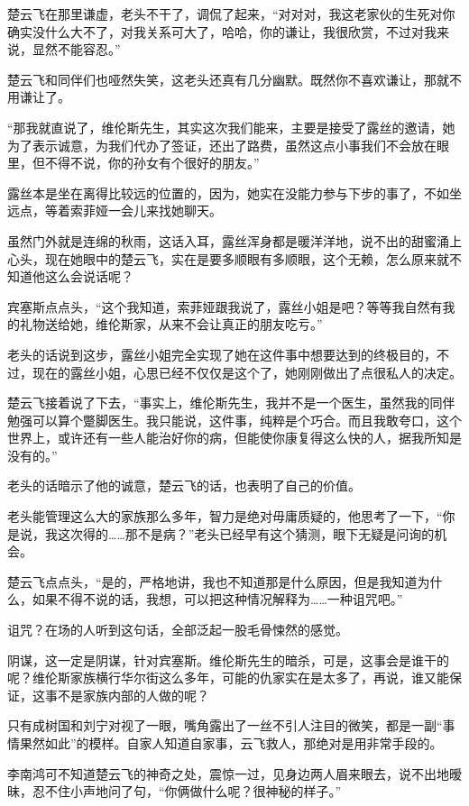 楚云飞在那里谦虚，老头不干了，调侃了起来，“对对对，我这老家伙的生死对你确实没什么大不了，对我关系可大了，哈哈，你的谦让，我很欣赏，不过对我来说，显然不能容忍。”

楚云飞和同伴们也哑然失笑，这老头还真有几分幽默。既然你不喜欢谦让，那就不用谦让了。

“那我就直说了，维伦斯先生，其实这次我们能来，主要是接受了露丝的邀请，她为了表示诚意，为我们代办了签证，还出了路费，虽然这点小事我们不会放在眼里，但不得不说，你的孙女有个很好的朋友。”

露丝本是坐在离得比较远的位置的，因为，她实在没能力参与下步的事了，不如坐远点，等着索菲娅一会儿来找她聊天。

虽然门外就是连绵的秋雨，这话入耳，露丝浑身都是暖洋洋地，说不出的甜蜜涌上心头，现在她眼中的楚云飞，实在是要多顺眼有多顺眼，这个无赖，怎么原来就不知道他这么会说话呢？

宾塞斯点点头，“这个我知道，索菲娅跟我说了，露丝小姐是吧？等等我自然有我的礼物送给她，维伦斯家，从来不会让真正的朋友吃亏。”

老头的话说到这步，露丝小姐完全实现了她在这件事中想要达到的终极目的，不过，现在的露丝小姐，心思已经不仅仅是这个了，她刚刚做出了点很私人的决定。

楚云飞接着说了下去，“事实上，维伦斯先生，我并不是一个医生，虽然我的同伴勉强可以算个蹩脚医生。我只能说，这件事，纯粹是个巧合。而且我敢夸口，这个世界上，或许还有一些人能治好你的病，但能使你康复得这么快的人，据我所知是没有的。”

老头的话暗示了他的诚意，楚云飞的话，也表明了自己的价值。

老头能管理这么大的家族那么多年，智力是绝对毋庸质疑的，他思考了一下，“你是说，我这次得的……那不是病？”老头已经早有这个猜测，眼下无疑是问询的机会。

楚云飞点点头，“是的，严格地讲，我也不知道那是什么原因，但是我知道为什么，如果不得不说的话，我想，可以把这种情况解释为……一种诅咒吧。”

诅咒？在场的人听到这句话，全部泛起一股毛骨悚然的感觉。

阴谋，这一定是阴谋，针对宾塞斯。维伦斯先生的暗杀，可是，这事会是谁干的呢？维伦斯家族横行华尔街这么多年，可能的仇家实在是太多了，再说，谁又能保证，这事不是家族内部的人做的呢？

只有成树国和刘宁对视了一眼，嘴角露出了一丝不引人注目的微笑，都是一副“事情果然如此”的模样。自家人知道自家事，云飞救人，那绝对是用非常手段的。

李南鸿可不知道楚云飞的神奇之处，震惊一过，见身边两人眉来眼去，说不出地暧昧，忍不住小声地问了句，“你俩做什么呢？很神秘的样子。”

